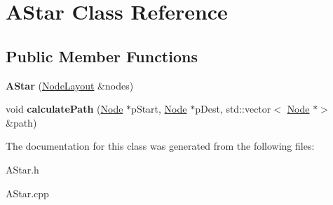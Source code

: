 \hypertarget{class_a_star}{}\section{A\+Star Class Reference}
\label{class_a_star}
\subsection*{Public Member Functions}
\begin{DoxyCompactItemize}
\item 
\mbox{\label{class_a_star_ab0b03d0729eb5cbf94969544dfaf8802}} 
{\bfseries A\+Star} (\mbox{\hyperlink{class_node_layout}{Node\+Layout}} \&nodes)
\item 
\mbox{\label{class_a_star_af4b37efdae8b35ee5a07c955a50ed192}} 
void {\bfseries calculate\+Path} (\mbox{\hyperlink{class_node}{Node}} $\ast$p\+Start, \mbox{\hyperlink{class_node}{Node}} $\ast$p\+Dest, std\+::vector$<$ \mbox{\hyperlink{class_node}{Node}} $\ast$$>$ \&path)
\end{DoxyCompactItemize}


The documentation for this class was generated from the following files\+:\begin{DoxyCompactItemize}
\item 
A\+Star.\+h\item 
A\+Star.\+cpp\end{DoxyCompactItemize}
